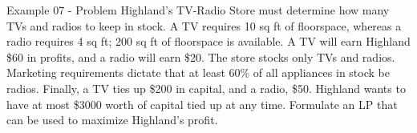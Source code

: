 \begin{frame}{Example 07 - Problem}
Highland's TV-Radio Store must determine how many TVs and radios to keep in
stock. A TV requires 10 sq ft of floorspace, whereas a radio requires 4 sq ft;
200 sq ft of floorspace is available. A TV will earn Highland \$60 in profits,
and a radio will earn \$20. The store stocks only TVs and radios. Marketing
requirements dictate that at least 60\% of all appliances in stock be radios.
Finally, a TV ties up \$200 in capital, and a radio, \$50. Highland wants to
have at most \$3000 worth of capital tied up at any time. Formulate an LP that
can be used to maximize Highland's profit.
\end{frame}
